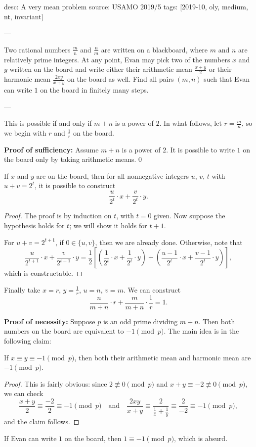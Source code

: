 desc: A very mean problem
source: USAMO 2019/5
tags: [2019-10, oly, medium, nt, invariant]

---

Two rational numbers $\tfrac mn$ and $\tfrac nm$ are written on a blackboard, where $m$ and $n$ are relatively prime integers. At any point, Evan may pick two of the numbers $x$ and $y$ written on the board and write either their arithmetic mean $\tfrac{x+y}2$ or their harmonic mean $\tfrac{2xy}{x+y}$ on the board as well. Find all pairs $(m,n)$ such that Evan can write $1$ on the board in finitely many steps.

---

This is possible if and only if $m+n$ is a power of $2$. In what follows, let $r=\tfrac mn$, so we begin with $r$ and $\tfrac1r$ on the board.

\bigskip

\textbf{Proof of sufficiency:} Assume $m+n$ is a power of $2$. It is possible to write $1$ on the board only by taking arithmetic means.
\setcounter{claim}0
\begin{claim}
    If $x$ and $y$ are on the board, then for all nonnegative integers $u$, $v$, $t$ with $u+v=2^t$, it is possible to construct \[\frac u{2^t}\cdot x+\frac v{2^t}\cdot y.\]
\end{claim}
\begin{proof}
    The proof is by induction on $t$, with $t=0$ given. Now suppose the hypothesis holds for $t$; we will show it holds for $t+1$.

    For $u+v=2^{t+1}$, if $0\in\{u,v\}$, then we are already done. Otherwise, note that \[\frac u{2^{t+1}}\cdot x+\frac v{2^{t+1}}\cdot y=\frac12\left[\left(\frac1{2^t}\cdot x+\frac1{2^t}\cdot y\right)+\left(\frac{u-1}{2^t}\cdot x+\frac{v-1}{2^t}\cdot y\right)\right],\]
    which is constructable.
\end{proof}

Finally take $x=r$, $y=\tfrac1r$, $u=n$, $v=m$. We can construct \[\frac n{m+n}\cdot r+\frac m{m+n}\cdot\frac1r=1.\]

\bigskip

\textbf{Proof of necessity:} Suppose $p$ is an odd prime dividing $m+n$. Then both numbers on the board are equivalent to $-1\pmod p$. The main idea is in the following claim:
\begin{claim}
    If $x\equiv y\equiv-1\pmod p$, then both their arithmetic mean and harmonic mean are $-1\pmod p$.
\end{claim}
\begin{proof}
    This is fairly obvious: since $2\not\equiv0\pmod p$ and $x+y\equiv-2\not\equiv0\pmod p$, we can check \[\frac{x+y}2\equiv\frac{-2}2\equiv-1\pmod p\quad\text{and}\quad\frac{2xy}{x+y}\equiv\frac2{\frac1x+\frac1y}\equiv\frac2{-2}\equiv-1\pmod p,\]
    and the claim follows.
\end{proof}

If Evan can write $1$ on the board, then $1\equiv-1\pmod p$, which is absurd.

